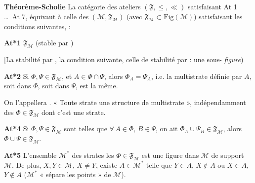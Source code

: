 \documentclass[11pt,a4paper]{article}
\begin{document}

\textbf{Théorème-Scholie} La catégorie des  ateliers $(\mathfrak{F}, \leq, \ll)$ satisfaisant At 1 \ldots\ At 7, équivaut à celle des $(\mathcal{M}, \mathfrak{F}_{\mathcal{M}})$ (avec $\mathfrak{F}_{\mathcal{M}} \subset \mathrm{Fig}(\mathcal{M})$) satisfaisant les conditions suivantes, \ill{} :

\textbf{At*1} $\mathfrak{F}_{\mathcal{M}}$   (stable par  )

 [La stabilité par \ill{}, \ill{} la condition suivante, \ill{} celle de \struck{\ill{}} stabilité par \ill{} : une sous- \ill{} \emph{figure})

\textbf{At*2} Si $\Phi, \Psi \in \mathfrak{F}_{\mathcal{M}}$, et $A \in \Phi \cap \Psi$, alors $\Phi_A = \Psi_A$, i.e. la multistrate définie par $A$, soit \struck{\ill{}} dans $\Phi$, soit dans $\Psi$, est la même.

On l'appellera \ill{} . « Toute strate   une structure de multistrate », indépendamment des $\Phi \in \mathfrak{F}_{\mathcal{M}}$ dont c'est une strate.


\textbf{At*4} Si $\Phi, \Psi \in \mathfrak{F}_{\mathcal{M}}$ sont telles que $\forall\, A \in \Phi$, $B \in \Psi$, \struck{\ill{}} on ait $\Phi_A \cup \Psi_B \in \mathfrak{F}_{\mathcal{M}}$, alors $\Phi \cup \Psi \in \mathfrak{F}_{\mathcal{M}}$.


\textbf{At*5} L'ensemble \struck{\ill{}} $\mathcal{M}^{*}$ des  strates \struck{\ill{}}  les $\Phi \in \mathfrak{F}_{\mathcal{M}}$ est une figure dans $\mathcal{M}$ de support $\mathcal{M}$. De plus,  $X, Y \in \mathcal{M}$, $X \neq Y$, existe $A \in \mathcal{M}^{*}$ telle que $Y \in A$, $X \notin A$ ou $X \in A$, $Y \notin A$ ($\mathcal{M}^{*}$ « sépare les points » de $\mathcal{M}$).
\end{document}
